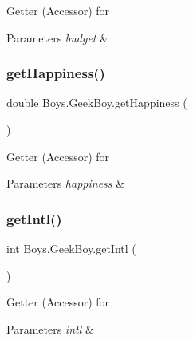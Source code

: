 Getter (Accessor) for 
\begin{DoxyParams}{Parameters}
{\em budget} & \\
\hline
\end{DoxyParams}
\mbox{\label{class_boys_1_1_geek_boy_ab11181055780cbb6730babf6be96942b}} 
\subsubsection{\texorpdfstring{get\+Happiness()}{getHappiness()}}
{\footnotesize\ttfamily double Boys.\+Geek\+Boy.\+get\+Happiness (\begin{DoxyParamCaption}{ }\end{DoxyParamCaption})\hspace{0.3cm}{\ttfamily [inline]}}

Getter (Accessor) for 
\begin{DoxyParams}{Parameters}
{\em happiness} & \\
\hline
\end{DoxyParams}
\mbox{\label{class_boys_1_1_geek_boy_adb53c1f4daa5a5254ce1558a795fb7a0}} 
\subsubsection{\texorpdfstring{get\+Intl()}{getIntl()}}
{\footnotesize\ttfamily int Boys.\+Geek\+Boy.\+get\+Intl (\begin{DoxyParamCaption}{ }\end{DoxyParamCaption})\hspace{0.3cm}{\ttfamily [inline]}}

Getter (Accessor) for 
\begin{DoxyParams}{Parameters}
{\em intl} & \\
\hline
\end{DoxyParams}
\mbox{\label{class_boys_1_1_geek_boy_aa4156000adebc076f01c3a4fb01bf4e4}} 
